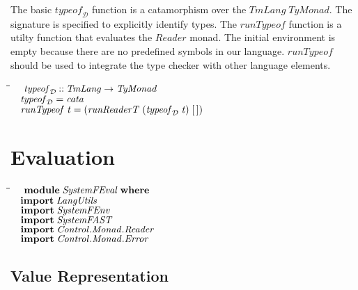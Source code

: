 \documentclass[10pt]{article}
\newlength{\lwidth}\setlength{\lwidth}{4.5cm}
\newlength{\cwidth}\setlength{\cwidth}{8mm} %
\newcommand{\Conid}[1]{\mathit{#1}}
\newcommand{\Varid}[1]{\mathit{#1}}
\begin{document}
The basic \ensuremath{\Varid{typeof}_{\mathcal D}} function is a catamorphism over the \ensuremath{\Conid{TmLang}\;\Conid{TyMonad}}.  The signature is specified to explicitly identify types.
The \ensuremath{\Varid{runTypeof}} function is a utilty function that evaluates the
\ensuremath{\Conid{Reader}} monad.  The initial environment is empty because there are no
predefined symbols in our language.  \ensuremath{\Varid{runTypeof}} should be used to
integrate the type checker with other language elements.

\begin{tabbing}
\qquad\=\hspace{\lwidth}\=\hspace{\cwidth}\=\+\kill
${\hskip1.00em\relax\Varid{typeof}_{\mathcal D}\mathbin{::}\Conid{TmLang}\to \Conid{TyMonad}}$\\
${\hskip1.00em\relax\Varid{typeof}_{\mathcal D}\mathrel{=}\Varid{cata}}$\\
${}$\\
${\hskip1.00em\relax\Varid{runTypeof}\;\Varid{t}\mathrel{=}(\Varid{runReaderT}\;(\Varid{typeof}_{\mathcal D}\;\Varid{t})\;[\mskip1.5mu \mskip1.5mu])}$
\end{tabbing}
\section{Evaluation}

\begin{tabbing}
\qquad\=\hspace{\lwidth}\=\hspace{\cwidth}\=\+\kill
${\hskip1.00em\relax\mathbf{module}\;\Conid{SystemFEval}\;\mathbf{where}}$\\
${}$\\
${\hskip1.00em\relax\mathbf{import}\;\Conid{LangUtils}}$\\
${\hskip1.00em\relax\mathbf{import}\;\Conid{SystemFEnv}}$\\
${\hskip1.00em\relax\mathbf{import}\;\Conid{SystemFAST}}$\\
${\hskip1.00em\relax\mathbf{import}\;\Conid{\Conid{Control}.\Conid{Monad}.Reader}}$\\
${\hskip1.00em\relax\mathbf{import}\;\Conid{\Conid{Control}.\Conid{Monad}.Error}}$
\end{tabbing}  
\subsection{Value Representation}
\end{document}

